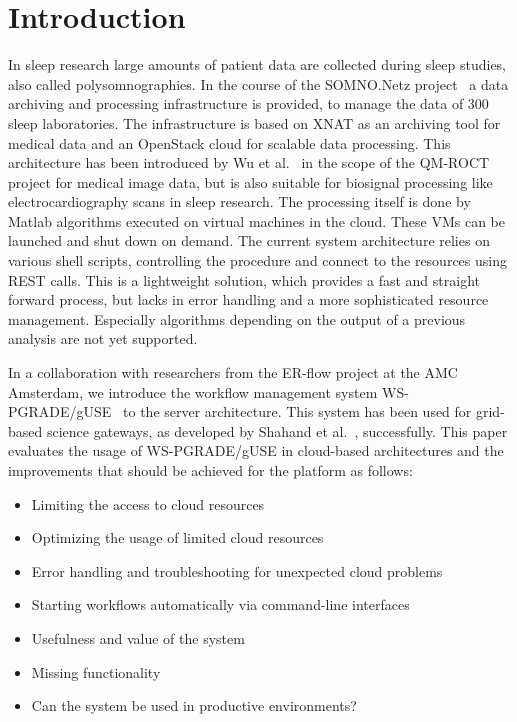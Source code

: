 \section{Introduction}\label{introduction}

In sleep research large amounts of patient data are collected during sleep studies, also called polysomnographies.
In the course of the SOMNO.Netz project~\cite{krefting13} a data archiving and processing infrastructure is provided, to manage the data of 300 sleep laboratories.
The infrastructure is based on XNAT as an archiving tool for medical data and an OpenStack cloud for scalable data processing.
This architecture has been introduced by Wu et al.~\cite{wu14} in the scope of the QM-ROCT project for medical image data, but is also suitable for biosignal processing like electrocardiography scans in sleep research.
The processing itself is done by Matlab algorithms executed on virtual machines in the cloud. These VMs can be launched and shut down on demand.
The current system architecture relies on various shell scripts, controlling the procedure and connect to the resources using REST \cite{richardson07} calls.
This is a lightweight solution, which provides a fast and straight forward process, but lacks in error handling and a more sophisticated resource management.
Especially algorithms depending on the output of a previous analysis are not yet supported.

In a collaboration with researchers from the ER-flow project at the AMC Amsterdam, we introduce the workflow management system WS-PGRADE/gUSE~\cite{balasko13} to the server architecture. This system has been used for grid-based science gateways, as developed by Shahand et al.~\cite{shahand13}, successfully.
This paper evaluates the usage of WS-PGRADE/gUSE in cloud-based architectures and the improvements that should be achieved for the platform as follows:

\begin{itemize}
\item Limiting the access to cloud resources
\item Optimizing the usage of limited cloud resources
\item Error handling and troubleshooting for unexpected cloud problems
\item Starting workflows automatically via command-line interfaces
\item Usefulness and value of the system
\item Missing functionality
\item Can the system be used in productive environments?
\end{itemize}